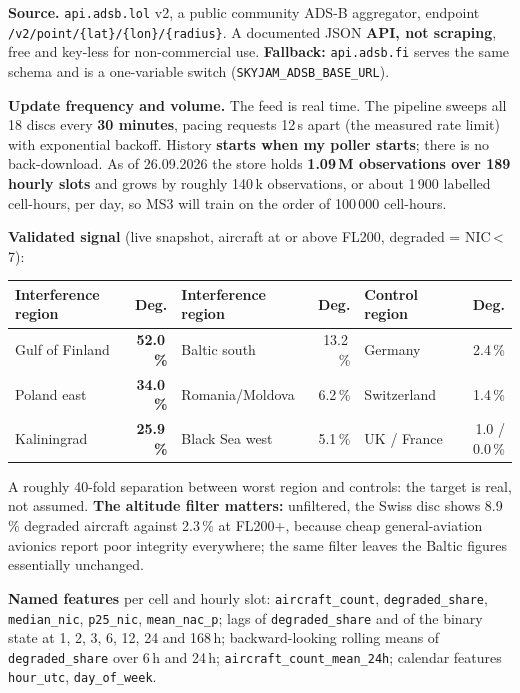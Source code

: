 \documentclass[10pt,a4paper]{article}
\newcommand{\code}[1]{\texttt{#1}}
\begin{document}
\textbf{Source.} \code{api.adsb.lol} v2, a public community ADS-B aggregator, endpoint
\code{/v2/point/\{lat\}/\{lon\}/\{radius\}}. A documented JSON \textbf{API, not scraping},
free and key-less for non-commercial use. \textbf{Fallback:} \code{api.adsb.fi} serves the
same schema and is a one-variable switch (\code{SKYJAM\_ADSB\_BASE\_URL}).

\textbf{Update frequency and volume.} The feed is real time. The pipeline sweeps all 18
discs every \textbf{30 minutes}, pacing requests 12\,s apart (the measured rate limit) with
exponential backoff. History \textbf{starts when my poller starts}; there is no
back-download. As of 26.09.2026 the store holds \textbf{1.09\,M observations over 189
hourly slots} and grows by roughly 140\,k observations, or about 1\,900 labelled cell-hours,
per day, so MS3 will train on the order of 100\,000 cell-hours.

\textbf{Validated signal} (live snapshot, aircraft at or above FL200, degraded = NIC\,<\,7):

\begin{tabularx}{\linewidth}{@{}Xr Xr Xr@{}}
\toprule
\textbf{Interference region} & \textbf{Deg.} & \textbf{Interference region} & \textbf{Deg.} & \textbf{Control region} & \textbf{Deg.} \\
\midrule
Gulf of Finland & \textbf{52.0\,\%} & Baltic south    & 13.2\,\% & Germany       & 2.4\,\% \\
Poland east     & \textbf{34.0\,\%} & Romania/Moldova & 6.2\,\%  & Switzerland   & 1.4\,\% \\
Kaliningrad     & \textbf{25.9\,\%} & Black Sea west  & 5.1\,\%  & UK / France   & 1.0 / 0.0\,\% \\
\bottomrule
\end{tabularx}

A roughly 40-fold separation between worst region and controls: the target is real, not
assumed. \textbf{The altitude filter matters:} unfiltered, the Swiss disc shows 8.9\,\%
degraded aircraft against 2.3\,\% at FL200+, because cheap general-aviation avionics report
poor integrity everywhere; the same filter leaves the Baltic figures essentially unchanged.

\textbf{Named features} per cell and hourly slot: \code{aircraft\_count},
\code{degraded\_share}, \code{median\_nic}, \code{p25\_nic}, \code{mean\_nac\_p}; lags of
\code{degraded\_share} and of the binary state at 1, 2, 3, 6, 12, 24 and 168\,h;
backward-looking rolling means of \code{degraded\_share} over 6\,h and 24\,h;
\code{aircraft\_count\_mean\_24h}; calendar features \code{hour\_utc}, \code{day\_of\_week}.
\end{document}
